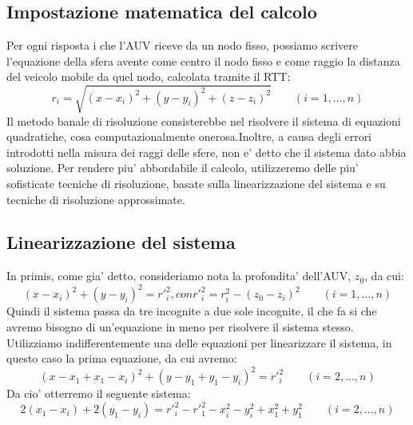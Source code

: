 \subsection{Impostazione matematica del calcolo}
Per ogni risposta i che l'AUV riceve da un nodo fisso, possiamo scrivere l'equazione della sfera avente come centro il nodo fisso e come raggio la distanza del veicolo mobile da quel nodo, calcolata tramite il RTT: \newline
\begin{equation}
r_{i} = \sqrt{(x-x_{i})^2+(y-y_{i})^2+(z-z_{i})^2} \qquad (i = 1,...,n)
\end{equation}
\newline
Il metodo banale di risoluzione consisterebbe nel risolvere il sistema di equazioni quadratiche, cosa computazionalmente onerosa.\newline Inoltre, a causa degli errori introdotti nella misura dei raggi delle sfere, non e' detto che il sistema dato abbia soluzione.\newline
Per rendere piu' abbordabile il calcolo, utilizzeremo delle piu' sofisticate tecniche di risoluzione, basate sulla linearizzazione del sistema e su tecniche di risoluzione approssimate.\newline

\subsection{Linearizzazione del sistema}
In primis, come gia' detto, consideriamo nota la profondita' dell'AUV, $z_{0}$, da cui:
\begin{equation}
(x-x_{i})^2+(y-y_{i})^2 = r'^2_{i} , con r'^2_{i} = r^2_{i}-(z_{0}-z_{i})^2 \qquad  (i = 1,...,n)
\end{equation}
\newline
Quindi il sistema passa da tre incognite a due sole incognite, il che fa si che avremo bisogno di un'equazione in meno per risolvere il sistema stesso.\newline
Utilizziamo indifferentemente una delle equazioni per linearizzare il sistema, in questo caso la prima equazione, da cui avremo:\newline
\begin{equation}
(x-x_{1}+x_{1}-x_{i})^2+(y-y_{1}+y_{1}-y_{i})^2 =  r'^2_{i} \qquad  (i = 2,...,n)
\end{equation}
\newline
Da cio' otterremo il seguente sistema:\newline
\begin{equation}
2(x_{1}-x_{i})+2(y_{1}-y_{i}) =  r'^2_{i}-r'^2_{1}-x^2_{i}-y^2_{i}+x^2_{1}+y^2_{1} \qquad (i = 2,...,n)
\end{equation}

